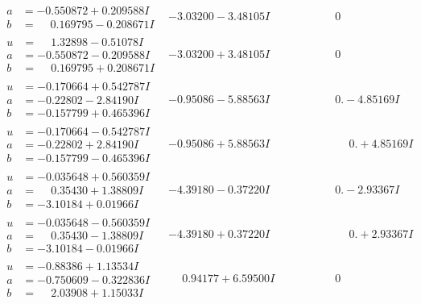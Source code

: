 \documentclass[1p]{elsarticle_modified}
\theoremstyle{definition}
\begin{document}
$$\begin{array}{c|c|c}
\begin{aligned}
a &= -0.550872 + 0.209588 I \\
b &= \phantom{-}0.169795 - 0.208671 I\end{aligned}
 & -3.03200 - 3.48105 I & \phantom{-0.000000 } 0 \\ \hline\begin{aligned}
u &= \phantom{-}1.32898 - 0.51078 I \\
a &= -0.550872 - 0.209588 I \\
b &= \phantom{-}0.169795 + 0.208671 I\end{aligned}
 & -3.03200 + 3.48105 I & \phantom{-0.000000 } 0 \\ \hline\begin{aligned}
u &= -0.170664 + 0.542787 I \\
a &= -0.22802 - 2.84190 I \\
b &= -0.157799 + 0.465396 I\end{aligned}
 & -0.95086 - 5.88563 I & \phantom{-0.000000 } 0. - 4.85169 I \\ \hline\begin{aligned}
u &= -0.170664 - 0.542787 I \\
a &= -0.22802 + 2.84190 I \\
b &= -0.157799 - 0.465396 I\end{aligned}
 & -0.95086 + 5.88563 I & \phantom{-0.000000 -}0. + 4.85169 I \\ \hline\begin{aligned}
u &= -0.035648 + 0.560359 I \\
a &= \phantom{-}0.35430 + 1.38809 I \\
b &= -3.10184 + 0.01966 I\end{aligned}
 & -4.39180 - 0.37220 I & \phantom{-0.000000 } 0. - 2.93367 I \\ \hline\begin{aligned}
u &= -0.035648 - 0.560359 I \\
a &= \phantom{-}0.35430 - 1.38809 I \\
b &= -3.10184 - 0.01966 I\end{aligned}
 & -4.39180 + 0.37220 I & \phantom{-0.000000 -}0. + 2.93367 I \\ \hline\begin{aligned}
u &= -0.88386 + 1.13534 I \\
a &= -0.750609 - 0.322836 I \\
b &= \phantom{-}2.03908 + 1.15033 I\end{aligned}
 & \phantom{-}0.94177 + 6.59500 I & \phantom{-0.000000 } 0 \\ \hline\begin{aligned}

\end{aligned}
\end{array}$$
\end{document}
